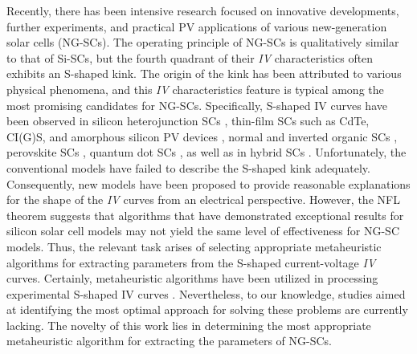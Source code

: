 \documentclass[a4paper,fleqn]{cas-sc}
\begin{document}
Recently, there has been intensive research focused on innovative developments, 
further experiments, and practical PV applications of various new-generation solar cells (NG-SCs).
The operating principle of NG-SCs is qualitatively similar to that of Si-SCs, 
but the fourth quadrant of their \emph{IV} characteristics often exhibits an S-shaped kink.
The origin of the kink has been attributed to various physical phenomena, 
and this \emph{IV} characteristics feature is typical among the most promising candidates for NG-SCs.
Specifically, S-shaped IV curves have been observed in silicon heterojunction SCs \cite{Saive2019},
thin-film SCs such as CdTe, CI(G)S, and amorphous silicon PV devices \cite{Saive2019,Roland2016},
normal and inverted organic SCs \cite{Gaur2014,Tran2017,Lastra2019},
perovskite SCs \cite{Saive2019,Xu2016},
quantum dot SCs \cite{Gao2011,Yu2019a},
as well as in hybrid SCs \cite{VeinbergVidal2016,Romero2017,Finck2013}.
Unfortunately, the conventional models have failed to describe the S-shaped kink adequately.
Consequently, new models have been proposed to provide reasonable explanations for the shape of the \emph{IV} curves from an electrical perspective.
However, the NFL theorem suggests that algorithms that have demonstrated exceptional results 
for silicon solar cell models may not yield the same level of effectiveness for NG-SC models.
Thus, the relevant task arises of selecting appropriate metaheuristic algorithms for extracting 
parameters from the S-shaped current-voltage \emph{IV} curves.
Certainly, metaheuristic algorithms have been utilized in processing experimental S-shaped IV curves \cite{Pillai2017}.
Nevertheless, to our knowledge, studies aimed at identifying the most optimal approach for solving these problems are currently lacking.
The novelty of this work lies in determining the most appropriate metaheuristic algorithm for extracting the parameters of NG-SCs. 
\end{document}
